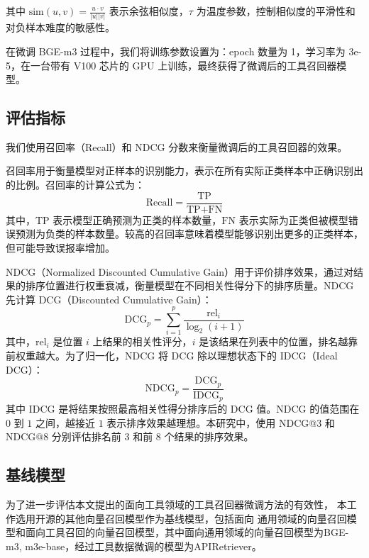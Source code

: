 其中 $\text{sim}(u, v) = \frac{u \cdot v}{|u| |v|}$ 表示余弦相似度，$\tau$ 为温度参数，控制相似度的平滑性和对负样本难度的敏感性。

在微调 BGE-m3 过程中，我们将训练参数设置为：epoch 数量为 1，学习率为 3e-5，在一台带有 V100 芯片的 GPU 上训练，最终获得了微调后的工具召回器模型。

\subsection{评估指标}

我们使用召回率（Recall）\cite{buckland1994relationship, powers2020evaluation}和 NDCG 分数\cite{wang2013theoretical}来衡量微调后的工具召回器的效果。

召回率用于衡量模型对正样本的识别能力，表示在所有实际正类样本中正确识别出的比例。召回率的计算公式为：
\begin{equation}
\text{Recall} = \frac{\text{TP}}{\text{TP} + \text{FN}}
\end{equation}
其中，$\text{TP}$ 表示模型正确预测为正类的样本数量，$\text{FN}$ 表示实际为正类但被模型错误预测为负类的样本数量。较高的召回率意味着模型能够识别出更多的正类样本，但可能导致误报率增加。

NDCG（Normalized Discounted Cumulative Gain）用于评价排序效果，通过对结果的排序位置进行权重衰减，衡量模型在不同相关性得分下的排序质量。NDCG 先计算 DCG（Discounted Cumulative Gain）：
\begin{equation}
\text{DCG}_p = \sum_{i=1}^{p} \frac{\text{rel}_i}{\log_2(i+1)}
\end{equation}
其中，$\text{rel}_i$ 是位置 $i$ 上结果的相关性评分，$i$ 是该结果在列表中的位置，排名越靠前权重越大。为了归一化，NDCG 将 DCG 除以理想状态下的 IDCG（Ideal DCG）：
\begin{equation}
\text{NDCG}_p = \frac{\text{DCG}_p}{\text{IDCG}_p}
\end{equation}
其中 IDCG 是将结果按照最高相关性得分排序后的 DCG 值。NDCG 的值范围在 $0$ 到 $1$ 之间，越接近 $1$ 表示排序效果越理想。本研究中，使用 NDCG@3 和 NDCG@8 分别评估排名前 3 和前 8 个结果的排序效果。

\subsection{基线模型}

为了进一步评估本文提出的面向工具领域的工具召回器微调方法的有效性，
本工作选用开源的其他向量召回模型作为基线模型，包括面向
通用领域的向量召回模型和面向工具召回的向量召回模型，其中面向通用领域的向量召回模型为BGE-m3\cite{chen2024bge}, m3e-base\cite{moka2024m3e}，经过工具数据微调的模型为APIRetriever\cite{Qin2023}。

